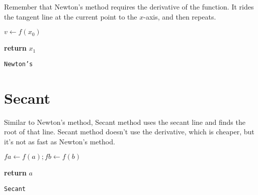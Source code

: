 \documentclass{article}
\begin{document}
Remember that Newton's method requires the derivative of the function.
It rides the tangent line at the current point to the $x$-axis, and
then repeats.

\begin{center}
	\begin{minipage}{0.5\linewidth} %
		\begin{algorithm}[H]

      $v \gets f(x_0)$



      {\bf return} $x_1$


			\caption{\texttt{Newton's}} %
			\label{alg:newton}   %
		\end{algorithm}
	\end{minipage}
\end{center}

\section{Secant}

Similar to Newton's method, Secant method uses the secant line
and finds the root of that line. Secant method doesn't use the derivative,
which is cheaper, but it's not as fast as Newton's method.

\begin{center}
	\begin{minipage}{0.5\linewidth} %
		\begin{algorithm}[H]

      $fa \gets f(a); fb \gets f(b)$

      {\bf return} $a$
      
			\caption{\texttt{Secant}} %
			\label{alg:secant}   %
		\end{algorithm}
	\end{minipage}
\end{center}
\end{document}

